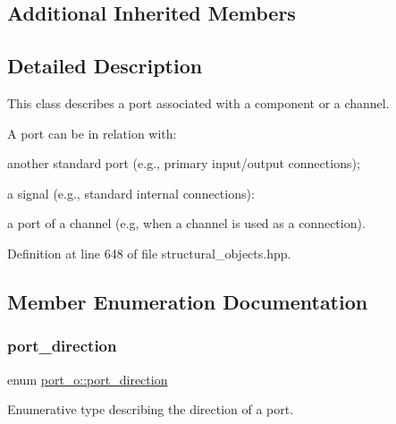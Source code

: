 \subsection*{Additional Inherited Members}


\subsection{Detailed Description}
This class describes a port associated with a component or a channel. 

A port can be in relation with\+:
\begin{DoxyItemize}
\item another standard port (e.\+g., primary input/output connections);
\item a signal (e.\+g., standard internal connections)\+:
\item a port of a channel (e.\+g, when a channel is used as a connection). 
\end{DoxyItemize}

Definition at line 648 of file structural\+\_\+objects.\+hpp.



\subsection{Member Enumeration Documentation}
\mbox{\label{structport__o_adb254df5665ff28b0769491cc3899fd5}} 
\subsubsection{\texorpdfstring{port\+\_\+direction}{port\_direction}}
{\footnotesize\ttfamily enum \hyperlink{structport__o_adb254df5665ff28b0769491cc3899fd5}{port\+\_\+o\+::port\+\_\+direction}}



Enumerative type describing the direction of a port. 

